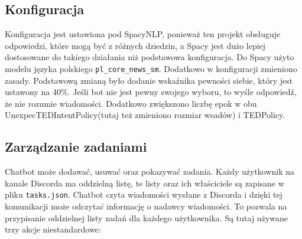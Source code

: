 \documentclass{article}
\begin{document}
\subsection{Konfiguracja}
Konfiguracja jest ustawiona pod SpacyNLP, ponieważ ten projekt obsługuje
odpowiedzi, które mogą być z różnych dziedzin, a Spacy jest dużo lepiej
dostosowane do takiego działania niż podstawowa konfiguracja. Do Spacy użyto
modelu języka polskiego \verb|pl_core_news_sm|. Dodatkowo w konfiguracji
zmieniono zasady. Podstawową zmianą było dodanie wskaźnika pewności siebie,
który jest ustawony na 40\%. Jeśli bot nie jest pewny swojego wyboru, to wyśle
odpowiedź, że nie rozumie wiadomości. Dodatkowo zwiększono liczbę epok w obu
UnexpecTEDIntentPolicy(tutaj też zmieniono rozmiar wsadów) i TEDPolicy.

\subsection{Zarządzanie zadaniami}
Chatbot może dodawać, usuwać oraz pokazywać zadania. Każdy użytkownik na kanale
Discorda ma oddzielną listę, te listy oraz ich właściciele są zapisane w pliku
\verb|tasks.json|. Chatbot czyta wiadomości wysłane z Discorda i dzięki tej
komunikacji może odczytać informację o nadawcy wiadomości. To pozwala na
przypisanie oddzielnej listy zadań dla każdego użytkownika. Są tutaj używane
trzy akcje niestandardowe:
\end{document}
